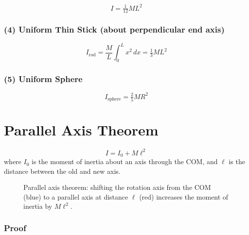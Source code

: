 \[
    \boxed{I = \tfrac{1}{12}ML^2}
\]

\subsubsection{(4) Uniform Thin Stick (about perpendicular end axis)}

\[
    I_\text{rod} = \frac{M}{L}\int_0^{L} x^2\,dx = \boxed{\tfrac{1}{3}ML^2}
\]

\subsubsection{(5) Uniform Sphere}

\[
    I_\text{sphere} = \tfrac{2}{5}MR^2
\]

\section{Parallel Axis Theorem}

\begin{theorem}
\[
    I = I_0 + M\ell^2
\]
where $I_0$ is the moment of inertia about an axis through the COM, and $\ell$ is the distance between the old and new axis.
\end{theorem}

\begin{figure}[H]
\begin{center}
\end{center}
\caption{Parallel axis theorem: shifting the rotation axis from the COM (blue) to a parallel axis at distance $\ell$ (red) increases the moment of inertia by $M\ell^2$.}
\label{fig:parallel_axis}
\end{figure}

\subsubsection*{Proof}

